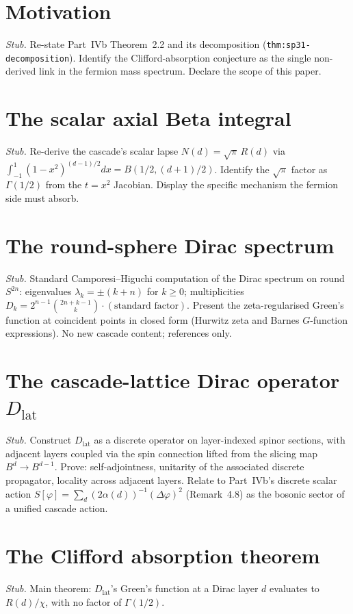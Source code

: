 \documentclass[12pt,a4paper]{article}
\begin{document}
\tableofcontents
\newpage

\section{Motivation}\label{sec:motivation}
\emph{Stub.} Re-state Part~IVb Theorem~2.2 and its decomposition
(\texttt{thm:sp31-decomposition}). Identify the Clifford-absorption
conjecture as the single non-derived link in the fermion mass
spectrum. Declare the scope of this paper.

\section{The scalar axial Beta integral}\label{sec:scalar-axial}
\emph{Stub.} Re-derive the cascade's scalar lapse
$N(d)=\sqrt{\pi}\,R(d)$ via
$\int_{-1}^{1}(1-x^2)^{(d-1)/2}dx = B(1/2,(d+1)/2)$. Identify the
$\sqrt{\pi}$ factor as $\Gamma(1/2)$ from the $t=x^2$ Jacobian.
Display the specific mechanism the fermion side must absorb.

\section{The round-sphere Dirac spectrum}\label{sec:dirac-spectrum}
\emph{Stub.} Standard Camporesi--Higuchi computation of the Dirac
spectrum on round $S^{2n}$:
eigenvalues $\lambda_k = \pm(k+n)$ for $k\geq 0$; multiplicities
$D_k = 2^{n-1}\binom{2n+k-1}{k}\cdot(\text{standard factor})$.
Present the zeta-regularised Green's function at coincident points
in closed form (Hurwitz zeta and Barnes $G$-function expressions).
No new cascade content; references only.

\section{The cascade-lattice Dirac operator \texorpdfstring{$D_{\mathrm{lat}}$}{D\_lat}}\label{sec:d-lat}
\emph{Stub.} Construct $D_{\mathrm{lat}}$ as a discrete operator on
layer-indexed spinor sections, with adjacent layers coupled via the
spin connection lifted from the slicing map $B^d \to B^{d-1}$.
Prove: self-adjointness, unitarity of the associated discrete
propagator, locality across adjacent layers. Relate to Part~IVb's
discrete scalar action $S[\varphi]=\sum_d (2\alpha(d))^{-1}(\Delta\varphi)^2$
(Remark~4.8) as the bosonic sector of a unified cascade action.

\section{The Clifford absorption theorem}\label{sec:clifford-absorption}
\emph{Stub.} Main theorem: $D_{\mathrm{lat}}$'s Green's function at a
Dirac layer $d$ evaluates to $R(d)/\chi$, with no factor of
$\Gamma(1/2)$.
\end{document}
